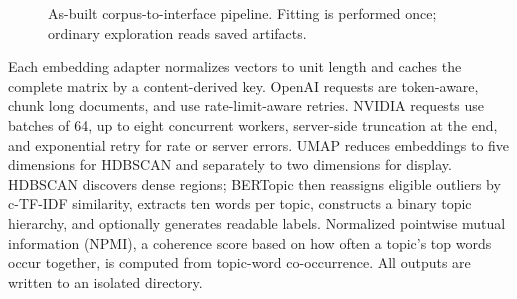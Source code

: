 \documentclass[11pt,a4paper]{article}
\newcommand{\sourcecode}[1]{\texttt{\detokenize{#1}}}
\begin{document}
\begin{figure}[htbp]
\centering
{}
\caption{As-built corpus-to-interface pipeline. Fitting is performed once; ordinary exploration reads saved artifacts.}
\label{fig:pipeline}
\end{figure}

Each embedding adapter normalizes vectors to unit length and caches the complete
matrix by a content-derived key. OpenAI requests are token-aware, chunk long
documents, and use rate-limit-aware retries. NVIDIA requests use batches of 64,
up to eight concurrent workers, server-side truncation at the end, and
exponential retry for rate or server errors. UMAP reduces embeddings to five
dimensions for HDBSCAN and separately to two dimensions for display.
HDBSCAN discovers dense regions; BERTopic then reassigns eligible outliers by
c-TF-IDF similarity, extracts ten words per topic, constructs a binary topic
hierarchy, and optionally generates readable labels. Normalized pointwise
mutual information (NPMI), a coherence score based on how often a topic's top
words occur together, is computed from topic-word co-occurrence. All outputs
are written to an isolated
\sourcecode{artifacts/<source>__<model>/} directory.
\end{document}
